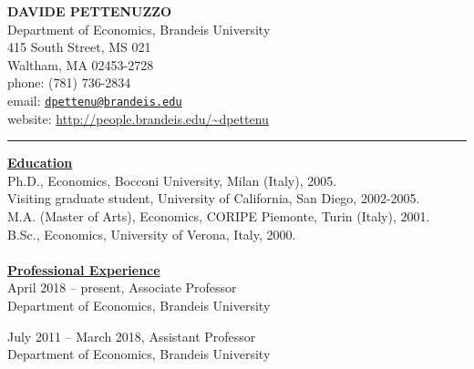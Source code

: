 \documentclass[12pt]{article}
\begin{document}
\begin{center}
\textbf{DAVIDE PETTENUZZO} \\
Department of Economics, Brandeis University \\
415 South Street, MS 021 \\
Waltham, MA 02453-2728 \\
phone: (781) 736-2834 \\
email: \href{mailto:dpettenu@brandeis.edu}{\nolinkurl{dpettenu@brandeis.edu}} \\
website: \url{http://people.brandeis.edu/~dpettenu} \\
\end{center}
\hrule 

\bigskip

\vspace{0.15in}

\underline{\textbf{Education}}\\
Ph.D., Economics, Bocconi University, Milan (Italy), 2005.\\
Visiting graduate student, University of California, San Diego, 2002-2005. \\
M.A. (Master of Arts), Economics, CORIPE Piemonte, Turin (Italy), 2001. \\
B.Sc., Economics, University of Verona, Italy, 2000.\\ \\
\underline{\textbf{Professional Experience}}\\
April 2018 -- present, Associate Professor \\
\hspace*{10mm} Department of Economics, Brandeis University

July 2011 -- March 2018, Assistant Professor \\
\hspace*{10mm} Department of Economics, Brandeis University
\end{document}
